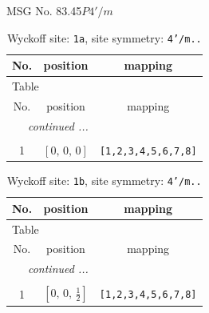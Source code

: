 \documentclass[fleqn,8pt]{jsarticle}
\begin{document}
\setcounter{MaxMatrixCols}{32}

\renewcommand{\tablename}{Table~}
\renewcommand{\figurename}{Figure~}
\begin{center}
\LARGE
MSG No. 83.45\quad$P4'/m$
\end{center}
\renewcommand{\arraystretch}{1.2}
\begin{longtable}{ccc}
\caption{Wyckoff site: {\tt 1a}, site symmetry: {\tt 4'/m..}}
 \\
 \hline \hline
No. & position & mapping \\ \hline \endfirsthead

\multicolumn{2}{l}{\tablename\ \thetable{}} \\
 \hline \hline
No. & position & mapping \\ \hline \endhead

 \hline \hline
\multicolumn{2}{r}{\footnotesize\it continued ...} \\ \endfoot

 \hline \hline
\multicolumn{2}{r}{} \\ \endlastfoot

1 & $\left[ 0,\, 0,\, 0 \right]$ & {\tt [1,2,3,4,5,6,7,8]} \\
\end{longtable}
\renewcommand{\arraystretch}{1.2}
\begin{longtable}{ccc}
\caption{Wyckoff site: {\tt 1b}, site symmetry: {\tt 4'/m..}}
 \\
 \hline \hline
No. & position & mapping \\ \hline \endfirsthead

\multicolumn{2}{l}{\tablename\ \thetable{}} \\
 \hline \hline
No. & position & mapping \\ \hline \endhead

 \hline \hline
\multicolumn{2}{r}{\footnotesize\it continued ...} \\ \endfoot

 \hline \hline
\multicolumn{2}{r}{} \\ \endlastfoot

1 & $\left[ 0,\, 0,\, \frac{1}{2} \right]$ & {\tt [1,2,3,4,5,6,7,8]} \\
\end{longtable}
\renewcommand{\arraystretch}{1.2}
\end{document}
